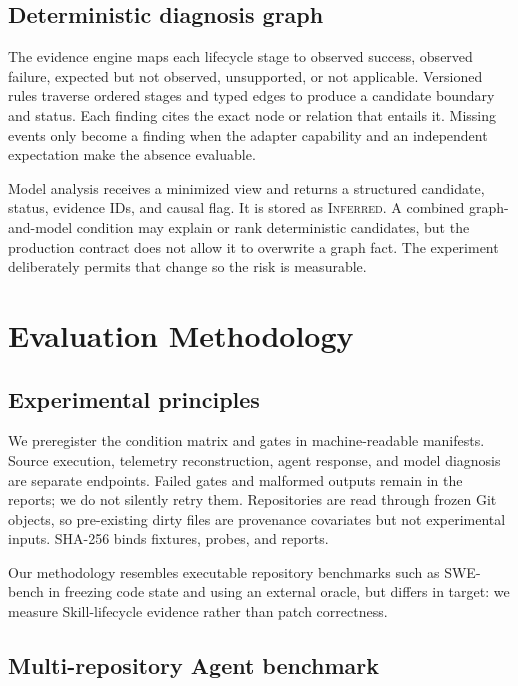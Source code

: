 \documentclass[runningheads]{llncs}
\newcommand{\inferred}{\textsc{Inferred}\xspace}
\begin{document}
\subsection{Deterministic diagnosis graph}

The evidence engine maps each lifecycle stage to observed success, observed
failure, expected but not observed, unsupported, or not applicable.
Versioned rules traverse ordered stages and typed edges to produce a candidate
boundary and status.  Each finding cites the exact node or relation that entails
it.  Missing events only become a finding when the adapter capability and an
independent expectation make the absence evaluable.

Model analysis receives a minimized view and returns a structured candidate,
status, evidence IDs, and causal flag.  It is stored as \inferred.  A combined
graph-and-model condition may explain or rank deterministic candidates, but the
production contract does not allow it to overwrite a graph fact.  The
experiment deliberately permits that change so the risk is measurable.

\section{Evaluation Methodology}

\subsection{Experimental principles}

We preregister the condition matrix and gates in machine-readable manifests.
Source execution, telemetry reconstruction, agent response, and model diagnosis
are separate endpoints.  Failed gates and malformed outputs remain in the
reports; we do not silently retry them.  Repositories are read through frozen
Git objects, so pre-existing dirty files are provenance covariates but not
experimental inputs.  SHA-256 binds fixtures, probes, and reports.

Our methodology resembles executable repository benchmarks such as SWE-bench
\cite{swebench} in freezing code state and using an external oracle, but differs
in target: we measure Skill-lifecycle evidence rather than patch correctness.

\subsection{Multi-repository Agent benchmark}
\end{document}
